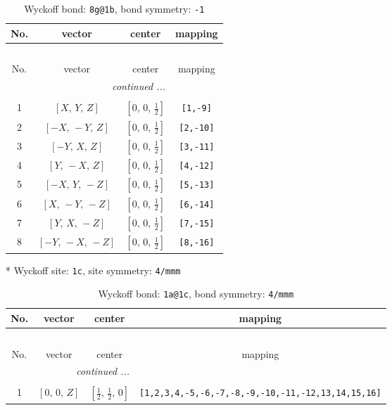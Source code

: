 \documentclass[fleqn,8pt]{jsarticle}
\begin{document}
\begin{longtable}{cccc}
\caption{Wyckoff bond: {\tt 8g@1b}, bond symmetry: {\tt -1}}
 \\
 \hline \hline
No. & vector & center & mapping \\ \hline \endfirsthead

\multicolumn{3}{l}{\tablename\ \thetable{}} \\
 \hline \hline
No. & vector & center & mapping \\ \hline \endhead

 \hline \hline
\multicolumn{3}{r}{\footnotesize\it continued ...} \\ \endfoot

 \hline \hline
\multicolumn{3}{r}{} \\ \endlastfoot

1 & $\left[ X,\, Y,\, Z \right]$ & $\left[ 0,\, 0,\, \frac{1}{2} \right]$ & {\tt [1,-9]} \\ \hline
2 & $\left[ - X,\, - Y,\, Z \right]$ & $\left[ 0,\, 0,\, \frac{1}{2} \right]$ & {\tt [2,-10]} \\ \hline
3 & $\left[ - Y,\, X,\, Z \right]$ & $\left[ 0,\, 0,\, \frac{1}{2} \right]$ & {\tt [3,-11]} \\ \hline
4 & $\left[ Y,\, - X,\, Z \right]$ & $\left[ 0,\, 0,\, \frac{1}{2} \right]$ & {\tt [4,-12]} \\ \hline
5 & $\left[ - X,\, Y,\, - Z \right]$ & $\left[ 0,\, 0,\, \frac{1}{2} \right]$ & {\tt [5,-13]} \\ \hline
6 & $\left[ X,\, - Y,\, - Z \right]$ & $\left[ 0,\, 0,\, \frac{1}{2} \right]$ & {\tt [6,-14]} \\ \hline
7 & $\left[ Y,\, X,\, - Z \right]$ & $\left[ 0,\, 0,\, \frac{1}{2} \right]$ & {\tt [7,-15]} \\ \hline
8 & $\left[ - Y,\, - X,\, - Z \right]$ & $\left[ 0,\, 0,\, \frac{1}{2} \right]$ & {\tt [8,-16]} \\
\end{longtable}
* Wyckoff site: {\tt 1c}, site symmetry: {\tt 4/mmm}
\renewcommand{\arraystretch}{1.2}
\begin{longtable}{cccc}
\caption{Wyckoff bond: {\tt 1a@1c}, bond symmetry: {\tt 4/mmm}}
 \\
 \hline \hline
No. & vector & center & mapping \\ \hline \endfirsthead

\multicolumn{3}{l}{\tablename\ \thetable{}} \\
 \hline \hline
No. & vector & center & mapping \\ \hline \endhead

 \hline \hline
\multicolumn{3}{r}{\footnotesize\it continued ...} \\ \endfoot

 \hline \hline
\multicolumn{3}{r}{} \\ \endlastfoot

1 & $\left[ 0,\, 0,\, Z \right]$ & $\left[ \frac{1}{2},\, \frac{1}{2},\, 0 \right]$ & {\tt [1,2,3,4,-5,-6,-7,-8,-9,-10,-11,-12,13,14,15,16]} \\
\end{longtable}
\end{document}
